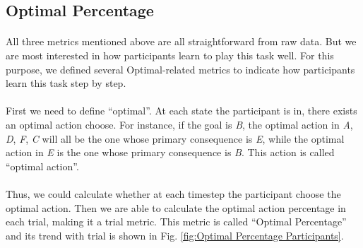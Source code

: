 \subsection{Optimal Percentage}
\label{sec:Optimal Percentage}
\paragraph{}
All three metrics mentioned above are all straightforward from raw data. But we are most interested in how participants learn to play this task well. For this purpose, we defined several Optimal-related metrics to indicate how participants learn this task step by step. 
\paragraph{}
First we need to define \enquote{optimal}. At each state the participant is in, there exists an optimal action choose. For instance, if the goal is \emph{B}, the optimal action in \emph{A}, \emph{D}, \emph{F}, \emph{C} will all be the one whose primary consequence is \emph{E}, while the optimal action in \emph{E} is the one whose primary consequence is \emph{B}. This action is called \enquote{optimal action}. 
\paragraph{}
Thus, we could calculate whether at each timestep the participant choose the optimal action. Then we are able to calculate the optimal action percentage in each trial, making it a trial metric. This metric is called \enquote{Optimal Percentage} and its trend with trial is shown in Fig. \ref{fig:Optimal Percentage Participants}. 

